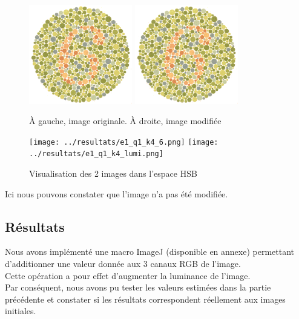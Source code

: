 \documentclass[a4paper]{article}
\begin{document}
\begin{figure}[H]
\begin{center}
\includegraphics[width=170px]{../base/cas_4_dalton6.png}
\includegraphics[width=170px]{../base/cas_4_luminance.png}
\end{center}
\caption{À gauche, image originale. À droite, image modifiée}
\end{figure}

\begin{figure}[H]
\begin{center}
\texttt{[image: ../resultats/e1\_q1\_k4\_6.png]}
\texttt{[image: ../resultats/e1\_q1\_k4\_lumi.png]}
\end{center}
\caption{Visualisation des 2 images dans l'espace HSB}
\end{figure}

Ici nous pouvons constater que l'image n'a pas été modifiée.

\subsection{Résultats}

Nous avons implémenté une macro ImageJ (disponible en annexe) permettant d'additionner une valeur donnée aux 3 canaux RGB de l'image.\\
Cette opération a pour effet d'augmenter la luminance de l'image.\\

Par conséquent, nous avons pu tester les valeurs estimées dans la partie précédente et constater si les résultats correspondent réellement aux images initiales.
\end{document}
